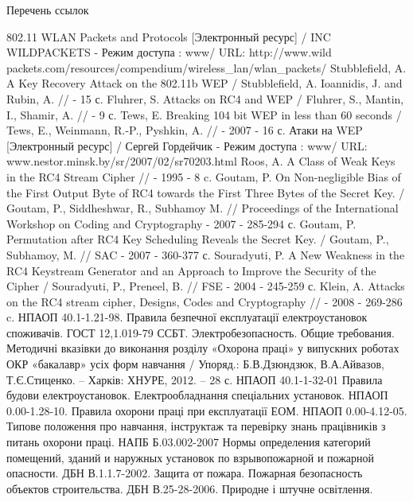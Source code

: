 \begin{bibset}{Перечень ссылок}
\begin{thebibliography}{}
     802.11 WLAN Packets and Protocols [Электронный ресурс] / INC WILDPACKETS - Режим доступа : www/ URL:
    http://www.wild packets.com/resources/compendium/wireless\_lan/wlan\_packets/
     Stubblefield, A. A Key Recovery Attack on the 802.11b WEP / Stubblefield, A. Ioannidis, J. and Rubin, A. // - 15 с.
     Fluhrer, S. Attacks on RC4 and WEP / Fluhrer, S., Mantin, I., Shamir, A. // - 9 с.
     Tews, E. Breaking 104 bit WEP in less than 60 seconds / Tews, E., Weinmann, R.-P., Pyshkin, A. // - 2007 - 16 с.
     Атаки на WEP [Электронный ресурс] / Сергей Гордейчик - Режим доступа : www/ URL: www.nestor.minsk.by/sr/2007/02/sr70203.html
     Roos, A. A Class of Weak Keys in the RC4 Stream Cipher // - 1995 - 8 c.
     Goutam, P. On Non-negligible Bias of the First Output Byte of RC4 towards the First Three Bytes of the Secret Key. / Goutam, P., Siddheshwar, R., Subhamoy M. // Proceedings of the International Workshop on Coding and Cryptography - 2007 - 285-294 с.
     Goutam, P. Permutation after RC4 Key Scheduling Reveals the Secret Key. / Goutam, P., Subhamoy, M. // SAC - 2007 - 360-377 с.
     Souradyuti, P. A New Weakness in the RC4 Keystream Generator and an Approach to Improve the Security of the Cipher / Souradyuti, P., Preneel, B. // FSE - 2004 - 245-259 с.
     Klein, A. Attacks on the RC4 stream cipher, Designs, Codes and Cryptography // - 2008 - 269-286 c.
     НПАОП 40.1-1.21-98. Правила безпечної експлуатації електроустановок споживачів.
     ГОСТ 12,1.019-79 ССБТ. Электробезопасность. Общие требования.
     Методичні вказівки до виконання розділу «Охорона праці» у випускних роботах ОКР «бакалавр» усіх форм навчання / Упоряд.: Б.В.Дзюндзюк, В.А.Айвазов, Т.Є.Стиценко. – Харків: ХНУРЕ, 2012. – 28 с.
     НПАОП 40.1-1-32-01 Правила будови електроустановок. Електрообладнання спеціальних установок. 
     НПАОП 0.00-1.28-10. Правила охорони праці при експлуатації ЕОМ.
     НПАОП 0.00-4.12-05. Типове положення про навчання, інструктаж та перевірку знань працівників з питань охорони праці.
     НАПБ Б.03.002-2007 Нормы определения категорий помещений, зданий и наружных установок по взрывопожарной и пожарной опасности.
     ДБН В.1.1.7-2002. Защита от пожара. Пожарная безопасность объектов строительства.
     ДБН В.25-28-2006. Природне і штучне освітлення.
\end{thebibliography}
\end{bibset}
